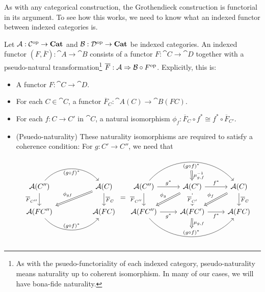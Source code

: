 \documentclass[DynamicalBook]{subfiles}
\begin{document}
As with any categorical construction, the Grothendieck construction is
functorial in its argument. To see how this works, we need to know what an
indexed functor between indexed categories is. 

\begin{definition}
  Let $\mathcal{A} : \mathcal{C}^{\textnormal{op}} \to \textbf{Cat}$ and $\mathcal{B} : \mathcal{D}^{\textnormal{op}} \to
  \textbf{Cat}$ be indexed categories. An indexed functor $(F, \overline{F}) :
  \cat{A} \to \cat{B}$ consists of a functor $F : \cat{C} \to \cat{D}$ together
  with a pseudo-natural transformation\footnote{As with the psuedo-functoriality
  of each indexed category, pseudo-naturality means naturality up to coherent
  isomorphism. In many of our cases, we will have bona-fide naturality.} $\overline{F} : \mathcal{A} \Rightarrow
  \mathcal{B} \circ F^{\textnormal{op}}$. Explicitly, this is:
  \begin{itemize}
  \item A functor $F : \cat{C} \to \cat{D}$.
  \item For each $C \in \cat{C}$, a functor $\overline{F}_C : \cat{A}(C) \to \cat{B}(FC)$.
  \item For each $f : C \to C'$ in $\cat{C}$, a natural isomorphism $\phi_f :
    \overline{F}_{C} \circ f^{\ast} \cong f^{\ast} \circ \overline{F}_{C'}$.
  \item (Psuedo-naturality) These naturality isomorphisms are required to satisfy a coherence condition: For $g : C' \to C''$,
    we need that
    \[
\begin{tikzcd}
\cat{A}(C'') \arrow[d, "\overline{F}_{C''}"']  \arrow[rr, "(g
\circ f)^\ast"{name=Top, below}, bend left=49]  &  & \cat{A}(C) \arrow[d,
"\overline{F}_C"] \arrow[lld, "\phi_{gf}"', Rightarrow] \\
\cat{A}(FC'')  \arrow[rr, "(g \circ
f)^{\ast}"'{name=Bottom, above}, bend right=49]                          &
                                                                          & \cat{A}(FC)                                                             
\end{tikzcd}
=
\begin{tikzcd}
\cat{A}(C'') \arrow[d, "\overline{F}_{C''}"'] \arrow[r, "g^\ast"] \arrow[rr, "(g
\circ f)^\ast"{name=Top, below}, bend left=49] \ar[r, Rightarrow, from=Top,
"\mu_{g, f}\inv"] & \cat{A}(C')  \arrow[r, "f^\ast"] \arrow[d, "\overline{F}_{C'}" description] \arrow[ld, "\phi_g"', Rightarrow] & \cat{A}(C) \arrow[d, "\overline{F}_C"] \arrow[ld, "\phi_f"', Rightarrow] \\
\cat{A}(FC'') \arrow[r, "g^{\ast}"'] \arrow[rr, "(g \circ
f)^{\ast}"'{name=Bottom, above}, bend right=49]                          &
\cat{A}(FC') \arrow[Rightarrow, to=Bottom, "\mu_{g, f}"] \arrow[r, "f^{\ast}"']                                                                          & \cat{A}(FC)                                                             
\end{tikzcd}
    \]
  \end{itemize}
\end{definition}
\end{document}
